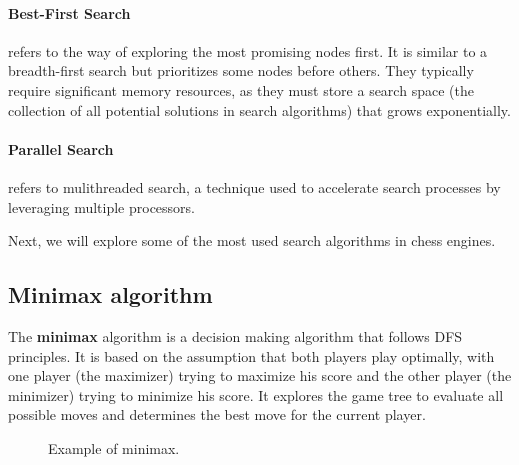 \paragraph{Best-First Search} refers to the way of exploring the most promising nodes first. It is similar to a breadth-first search but prioritizes some nodes before others. They typically require significant memory resources, as they must store a search space (the collection of all potential solutions in search algorithms) that grows exponentially.

\paragraph{Parallel Search} refers to mulithreaded search, a technique used to accelerate search processes by leveraging multiple processors.

\vspace{1em}

\noindent Next, we will explore some of the most used search algorithms in chess engines.

\subsection{Minimax algorithm}

The \textbf{minimax} algorithm is a decision making algorithm that follows DFS principles. It is based on the assumption that both players play optimally, with one player (the maximizer) trying to maximize his score and the other player (the minimizer) trying to minimize his score. It explores the game tree to evaluate all possible moves and determines the best move for the current player.

\begin{figure}[H]
    \centering
    \caption{Example of minimax.}
    \label{fig:minimax}
\end{figure}


